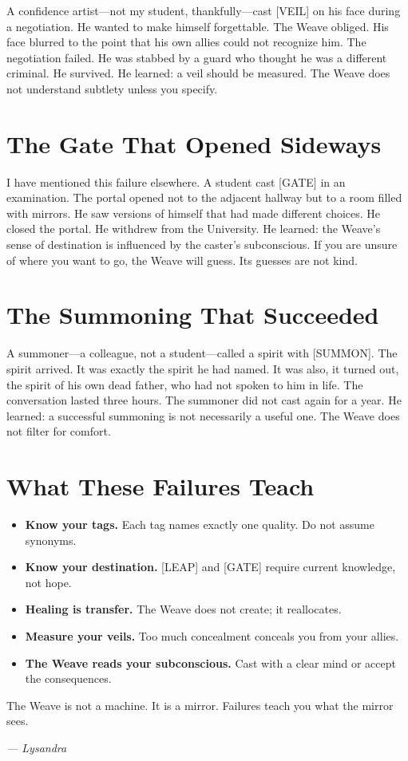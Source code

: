 A confidence artist---not my student, thankfully---cast [VEIL] on his face during a negotiation. He wanted to make himself forgettable. The Weave obliged. His face blurred to the point that his own allies could not recognize him. The negotiation failed. He was stabbed by a guard who thought he was a different criminal. He survived. He learned: a veil should be measured. The Weave does not understand subtlety unless you specify.

\section{The Gate That Opened Sideways}

I have mentioned this failure elsewhere. A student cast [GATE] in an examination. The portal opened not to the adjacent hallway but to a room filled with mirrors. He saw versions of himself that had made different choices. He closed the portal. He withdrew from the University. He learned: the Weave's sense of destination is influenced by the caster's subconscious. If you are unsure of where you want to go, the Weave will guess. Its guesses are not kind.

\section{The Summoning That Succeeded}

A summoner---a colleague, not a student---called a spirit with [SUMMON]. The spirit arrived. It was exactly the spirit he had named. It was also, it turned out, the spirit of his own dead father, who had not spoken to him in life. The conversation lasted three hours. The summoner did not cast again for a year. He learned: a successful summoning is not necessarily a useful one. The Weave does not filter for comfort.

\section{What These Failures Teach}

\begin{itemize}
    \item \textbf{Know your tags.} Each tag names exactly one quality. Do not assume synonyms.
    \item \textbf{Know your destination.} [LEAP] and [GATE] require current knowledge, not hope.
    \item \textbf{Healing is transfer.} The Weave does not create; it reallocates.
    \item \textbf{Measure your veils.} Too much concealment conceals you from your allies.
    \item \textbf{The Weave reads your subconscious.} Cast with a clear mind or accept the consequences.
\end{itemize}

The Weave is not a machine. It is a mirror. Failures teach you what the mirror sees.

\textit{--- Lysandra}
